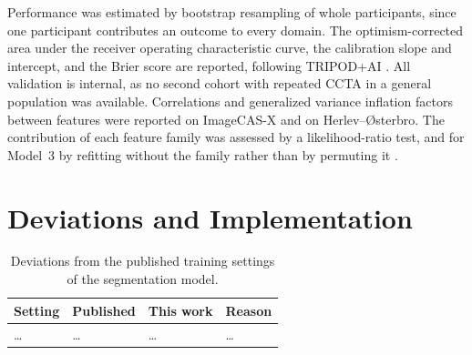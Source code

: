 Performance was estimated by bootstrap resampling of whole participants, since one participant
contributes an outcome to every domain.
The optimism-corrected area under the receiver operating characteristic curve, the calibration
slope and intercept, and the Brier score are reported, following TRIPOD+AI
\cite{collins2024tripodai}.
All validation is internal, as no second cohort with repeated CCTA in a general population was
available.
Correlations and generalized variance inflation factors \cite{fox1992gvif} between features were
reported on ImageCAS-X and on Herlev--{\O}sterbro.
The contribution of each feature family was assessed by a likelihood-ratio test, and for Model~3 by
refitting without the family rather than by permuting it \cite{hooker2021permutation}.


\section{Deviations and Implementation}
\label{sec:method-deviations}

\begin{table}[htbp]
  \centering
  \small
  \begin{tabular}{@{}llll@{}}
    \toprule
    Setting & Published & This work & Reason \\
    \midrule
    \ldots & \ldots & \ldots & \ldots \\
    \bottomrule
  \end{tabular}
  \caption{Deviations from the published training settings of the segmentation model.}
  \label{tab:method-deviations}
\end{table}

